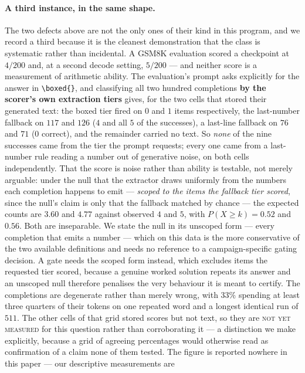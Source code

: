 \documentclass[11pt]{article}
\newcommand{\notrun}{\textsc{not yet measured}}
\begin{document}
\paragraph{A third instance, in the same shape.} The two defects above are not the only
ones of their kind in this program, and we record a third because it is the cleanest
demonstration that the class is systematic rather than incidental. A GSM8K evaluation
scored a checkpoint at $4/200$ and, at a second decode setting, $5/200$ --- and
neither score is a measurement of arithmetic ability. The evaluation's prompt asks
explicitly for the answer in \texttt{\textbackslash boxed\{\}}, and classifying all
two hundred completions \textbf{by the scorer's own extraction tiers} gives, for the
two cells that stored their generated text: the boxed tier fired on $0$ and $1$ items
respectively, the last-number fallback on $117$ and $126$ ($4$ and all $5$ of the
successes), a last-line fallback on $76$ and $71$ ($0$ correct), and the remainder
carried no text. So \emph{none} of the nine successes came from the tier the prompt
requests; every one came from a last-number rule reading a number out of generative
noise, on both cells independently. That the score is noise rather than ability is
testable, not merely arguable: under the null that the extractor draws uniformly from
the numbers each completion happens to emit --- \emph{scoped to the items the fallback
tier scored}, since the null's claim is only that the fallback matched by chance ---
the expected counts are $3.60$ and $4.77$ against observed $4$ and $5$, with
$P(X \geq k) = 0.52$ and $0.56$. Both are inseparable. We state the null in its unscoped form --- every completion that emits a number --- which on this data is the more conservative of the two available definitions and needs no reference to a campaign-specific gating decision. A gate needs the scoped form instead, which excludes items the requested tier scored, because a genuine worked solution repeats its answer and an unscoped null therefore penalises the very behaviour it is meant to certify. The completions are degenerate
rather than merely wrong, with $33\%$ spending at least three quarters of their tokens
on one repeated word and a longest identical run of $511$. The other cells of that
grid stored scores but not text, so they are \notrun{} for this question rather than
corroborating it --- a distinction we make explicitly, because a grid of agreeing
percentages would otherwise read as confirmation of a claim none of them tested. The
figure is reported nowhere in this paper --- our descriptive measurements are
\end{document}
